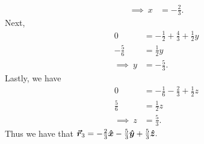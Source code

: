 \documentclass[12pt]{article} %
\begin{document}
\begin{solution}
\begin{align*}
    \implies~ x&= -\frac{2}{3}.
\end{align*}
Next,
\begin{align*}
    0&= -\frac{1}{2} +\frac{4}{3}+\frac{1}{2}y\\
    -\frac{5}{6}&= \frac{1}{2}y\\
    \implies~ y&= -\frac{5}{3}.
\end{align*}
Lastly, we have
\begin{align*}
    0&= -\frac{1}{6}-\frac{2}{3} +\frac{1}{2}z\\
    \frac{5}{6} &= \frac{1}{2}z\\
    \implies~ z&= \frac{5}{3}.
\end{align*}
Thus we have that $\boldsymbol{\vec{r}}_3 = -\frac{2}{3} \boldsymbol{\hat{x}} - \frac{5}{3}\boldsymbol{\hat{y}} + \frac{5}{3}\boldsymbol{\hat{z}}.$
\end{solution}
\end{document}
